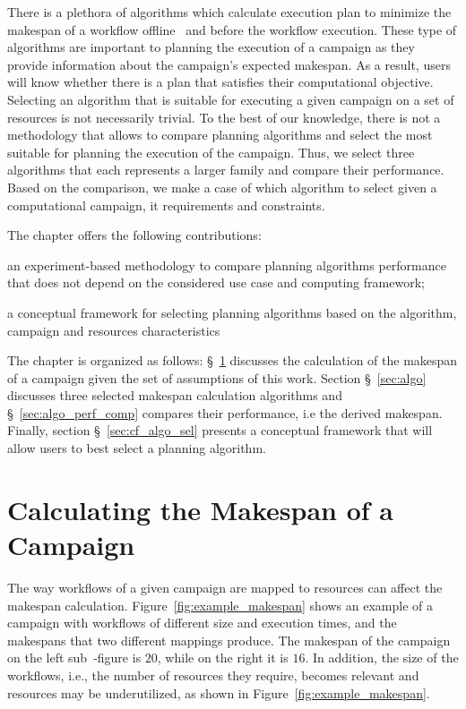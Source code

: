 There is a plethora of algorithms which calculate execution plan to minimize the makespan of a workflow offline~\cite{lu2019review} and before the workflow execution.
These type of algorithms are important to planning the execution of a campaign as they provide information about the campaign's expected makespan.
As a result, users will know whether there is a plan that satisfies their computational objective.
Selecting an algorithm that is suitable for executing a given campaign on a set of resources is not necessarily trivial.
To the best of our knowledge, there is not a methodology that allows to compare planning algorithms and select the most suitable for planning the execution of the campaign.
Thus, we select three algorithms that each represents a larger family and compare their performance.
Based on the comparison, we make a case of which algorithm to select given a computational campaign, it requirements and constraints.

The chapter offers the following contributions:
\begin{inparaenum}[i)]
    \item an experiment-based methodology to compare planning algorithms performance that does not depend on the considered use case and computing framework;
    \item a conceptual framework for selecting planning algorithms based on the algorithm, campaign and resources characteristics
\end{inparaenum}

The chapter is organized as follows: \S~\ref{sec:makespan_calc} discusses the calculation of the makespan of a campaign given the set of assumptions of this work.
Section \S~\ref{sec:algo} discusses three selected makespan calculation algorithms and \S~\ref{sec:algo_perf_comp} compares their performance, i.e the derived makespan.
Finally, section \S~\ref{sec:cf_algo_sel} presents a conceptual framework that will allow users to best select a planning algorithm.

\section{Calculating the Makespan of a Campaign}
\label{sec:makespan_calc}
The way workflows of a given campaign are mapped to resources can affect the makespan calculation. 
Figure~\ref{fig:example_makespan} shows an example of a campaign with workflows of different size and execution times, and the makespans that two different mappings produce.
The makespan of the campaign on the left sub~-figure is $20$, while on the right it is $16$.
In addition, the size of the workflows, i.e., the number of resources they require, becomes relevant and resources may be underutilized, as shown in Figure~\ref{fig:example_makespan}.

